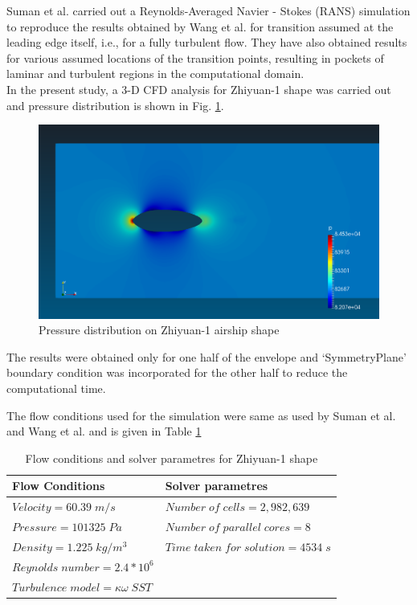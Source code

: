 Suman et al. \cite{suman} carried out a Reynolds-Averaged Navier - Stokes (RANS) simulation to reproduce the results obtained by Wang et al. \cite{zhiyuan} for transition assumed at the leading edge itself, i.e., for a fully turbulent flow. They have also obtained results for various assumed locations of the transition points, resulting in pockets of laminar and turbulent regions in the computational domain.\\
In the present study, a 3-D CFD analysis for Zhiyuan-1 shape was carried out and pressure distribution is shown in Fig. \ref {fig:Zhiyuan-1 pressure}. 
\begin{figure}[H]
	\centering
	\includegraphics[width=300 pt]{rnd/pressure_zhiyuan.png}
	\caption{Pressure distribution on Zhiyuan-1 airship shape}
	\label{fig:Zhiyuan-1 pressure} %
\end{figure}

The results were obtained only for one half of the envelope and `SymmetryPlane' boundary condition was incorporated for the other half to reduce the computational time.

The flow conditions used for the simulation were same as used by Suman et al. \cite{suman} and Wang et al. \cite{zhiyuan} and is given in Table \ref{Flow conditions and solver parametres for Zhiyuan-1 shape}

\begin{table}[H]
	\caption{Flow conditions and solver parametres for Zhiyuan-1 shape}
	\label{Flow conditions and solver parametres for Zhiyuan-1 shape}
	\centering
	\begin{tabular}{ll}
		\hline \hline
		Flow Conditions & Solver parametres  \\ \hline \hline
		
		$ Velocity = 60.39 \; m/s$ & $Number \; of \; cells = 2,982,639$    \\  
		$ Pressure = 101325 \; Pa $ & $ Number \; of \; parallel \; cores = 8 $     \\
		$ Density = 1.225 \; kg/m^{3} $ & $ Time \; taken \; for \; solution = 4534 \; s  $    \\
		$ Reynolds \; number = 2.4 * 10^{6} $ &    \\
		$ Turbulence \; model = \kappa \omega \; SST $ &     \\
		\hline
	\end{tabular}
\end{table}


